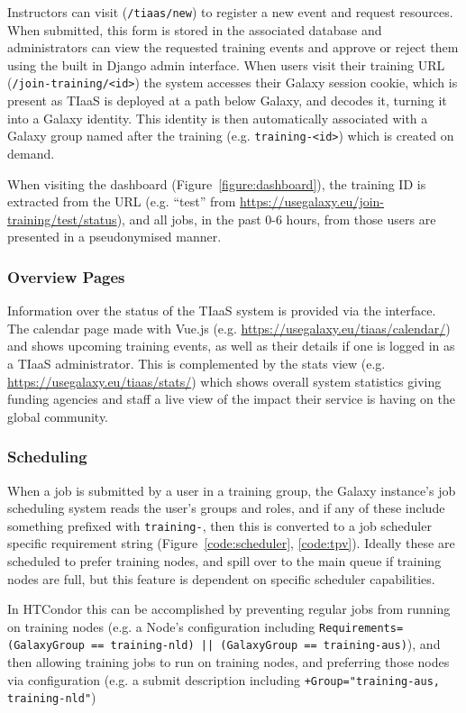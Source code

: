 \documentclass[a4paper,num-refs]{oup-contemporary}
\begin{document}
Instructors can visit (\texttt{/tiaas/new}) to register a new event and request resources. When submitted, this form is stored in the associated database and administrators can view the requested training events and approve or reject them using the built in Django admin interface. When users visit their training URL (\texttt{/join-training/<id>}) the system accesses their Galaxy session cookie, which is present as TIaaS is deployed at a path below Galaxy, and decodes it, turning it into a Galaxy identity. This identity is then automatically associated with a Galaxy group named after the training (e.g. \texttt{training-<id>}) which is created on demand.

When visiting the dashboard (Figure~\ref{figure:dashboard}), the training ID is extracted from the URL (e.g. ``test'' from \url{https://usegalaxy.eu/join-training/test/status}), and all jobs, in the past 0-6 hours, from those users are presented in a pseudonymised manner.

\subsubsection{Overview Pages}
Information over the status of the TIaaS system is provided via the interface. The calendar page made with Vue.js \cite{Vue} (e.g. \url{https://usegalaxy.eu/tiaas/calendar/}) and shows upcoming training events, as well as their details if one is logged in as a TIaaS administrator. This is complemented by the stats view (e.g. \url{https://usegalaxy.eu/tiaas/stats/}) which shows overall system statistics giving funding agencies and staff a live view of the impact their service is having on the global community.

\subsubsection{Scheduling}
When a job is submitted by a user in a training group, the Galaxy instance's job scheduling system reads the user's groups and roles, and if any of these include something prefixed with \texttt{training-}, then this is converted to a job scheduler specific requirement string (Figure~\ref{code:scheduler}, \ref{code:tpv}). Ideally these are scheduled to prefer training nodes, and spill over to the main queue if training nodes are full, but this feature is dependent on specific scheduler capabilities.

In HTCondor this can be accomplished by preventing regular jobs from running on training nodes (e.g. a Node's configuration including \texttt{Requirements=(GalaxyGroup == training-nld) || (GalaxyGroup == training-aus)}), and then allowing training jobs to run on training nodes, and preferring those nodes via configuration (e.g. a submit description including \texttt{+Group="training-aus, training-nld"})
\end{document}
